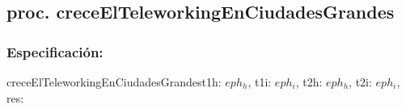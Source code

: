 \subsection{proc. creceElTeleworkingEnCiudadesGrandes}

    \subsubsection{Especificaci\'on:}
        \begin{proc}{creceElTeleworkingEnCiudadesGrandes}{\In t1h: $eph_{h}$, \In t1i: $eph_{i}$, \In t2h: $eph_{h}$, \In t2i: $eph_{i}$, \Out res: \bool}{}
        \end{proc}

